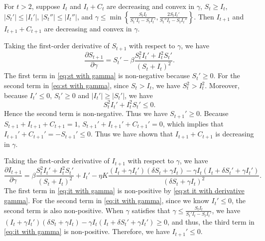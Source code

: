\documentclass[nonblindrev, copyedit]{informs3a}
\newcounter{prop}[chapter]
\begin{document}
\begin{proposition}
\label{Extensions with gamma}
For $t>2$, suppose $I_{t}$ and $I_{t}+C_{t}$ are decreasing and convex in $\gamma$, $S_{t}\ge I_{t}$, $|S_{t}'|\le |I_{t}'|$, $|S_{t}''|\le |I_{t}''|$, and
$\gamma\le\min\left\{\frac{S_{t}I_{t}}{S_{t}'I_{t}-S_{t}I_{t}'},\frac{2S_{t}I_{t}'}{S_{t}''I_{t}-S_{t}I_{t}''}\right\}
$. Then $I_{t+1}$ and $I_{t+1}+C_{t+1}$ are decreasing and convex in $\gamma$.
\end{proposition}

Taking the first-order derivative of $S_{t+1}$ with respect to $\gamma$, we have
\begin{equation}\label{eq:st with gamma}
    \frac{\partial S_{t+1}}{\partial \gamma}=S_{t}'-\beta\frac{S_{t}^2I_t'+I_{t}^2S_t'}{(S_{t}+I_{t})^2}.
\end{equation}
The first term in \eqref{eq:st with gamma} is non-negative because $S_t'\ge0$.
For the second term in \eqref{eq:st with gamma}, since $S_{t}>I_{t}$, we have $S_{t}^2>I_{t}^2$. Moreover, because $I_t'\le 0$, $S_t'\ge 0$ and $|I_{t}'|\ge|S_{t}'|$,
we have
\begin{equation}\label{eq:st it with derivative gamma}
    S_{t}^2I_t'+I_{t}^2S_t'\le0.
\end{equation}
Hence the second term is non-negative. Thus we have $S_{t+1}'\ge0$.
Because $S_{t+1}+I_{t+1}+C_{t+1}=1$, $S_{t+1}'+I_{t+1}'+C_{t+1}'=0$,
which implies that $I_{t+1}'+C_{t+1}'=-S_{t+1}'\le0$.
Thus we have shown that $I_{t+1}+C_{t+1}$ is decreasing in $\gamma$.

Taking the first-order derivative of $I_{t+1}$ with respect to $\gamma$, we have
\begin{equation}
    \frac{\partial I_{t+1}}{\partial \gamma}=\beta\frac{S_{t}^2I_t'+I_{t}^2S_t'}{(S_{t}+I_{t})^2}+I_t'-\eta K\frac{(I_t+\gamma I_t')(\delta S_{t}+\gamma I_{t})-\gamma I_t(I_{t}+\delta S_{t}'+\gamma I_{t}')}{(\delta S_{t}+\gamma I_{t})^2}.\label{eq:it with gamma}
\end{equation}
The first term in \eqref{eq:it with gamma} is non-positive by \eqref{eq:st it with derivative gamma}.
For the second term in \eqref{eq:it with gamma}, since we know $I_t'\le0$, the second term is also non-positive. When $\gamma$ satisfies that $\gamma\le\frac{S_{t}I_{t}}{S_{t}'I_{t}-S_{t}I_{t}'}$, we have $(I_t+\gamma I_t')(\delta S_{t}+\gamma I_{t})-\gamma I_t(I_{t}+\delta S_{t}'+\gamma I_{t}')\ge0$, and thus, the third term in \eqref{eq:it with gamma} is non-positive.
Therefore, we have $I_{t+1}'\le0$.
\end{document}
